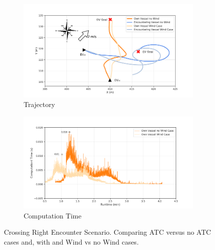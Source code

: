 \begin{figure}[H]
            \begin{subfigure}[b]{0.49\textwidth}
                \centering
                \includegraphics[width=\textwidth]{figs/Chap5/plot_cl_w_vs_wind.pdf}
                \caption{Trajectory}
                \label{fig:plot_cl_w_vs_wind}
            \end{subfigure}
            \begin{subfigure}[b]{0.49\textwidth}
                \centering
                \includegraphics[width=\textwidth]{figs/Chap5/plot_cl_w_vs_wind_CT.png}
                \caption{Computation Time}
                \label{fig:plot_cl_w_vs_wind_CT}
            \end{subfigure}
        
        \caption{Crossing Right Encounter Scenario. Comparing \ac{ATC} versus no \ac{ATC} cases and, with and Wind vs no Wind cases.}
        \label{fig:plots_cl}
        \end{figure}
        
